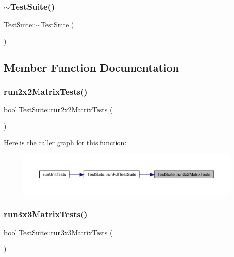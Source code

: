 \subsubsection{\texorpdfstring{$\sim$TestSuite()}{~TestSuite()}}
{\footnotesize\ttfamily Test\+Suite\+::$\sim$\+Test\+Suite (\begin{DoxyParamCaption}{ }\end{DoxyParamCaption})}



\subsection{Member Function Documentation}
\mbox{\label{class_test_suite_acf6d1ad1920132a4aed74457bb2df8cb}} 
\subsubsection{\texorpdfstring{run2x2MatrixTests()}{run2x2MatrixTests()}}
{\footnotesize\ttfamily bool Test\+Suite\+::run2x2\+Matrix\+Tests (\begin{DoxyParamCaption}{ }\end{DoxyParamCaption})}

Here is the caller graph for this function\+:
\nopagebreak
\begin{figure}[H]
\begin{center}
\leavevmode
\includegraphics[width=350pt]{class_test_suite_acf6d1ad1920132a4aed74457bb2df8cb_icgraph}
\end{center}
\end{figure}
\mbox{\label{class_test_suite_a91444c36a86d453cc9922d888b248a6b}} 
\subsubsection{\texorpdfstring{run3x3MatrixTests()}{run3x3MatrixTests()}}
{\footnotesize\ttfamily bool Test\+Suite\+::run3x3\+Matrix\+Tests (\begin{DoxyParamCaption}{ }\end{DoxyParamCaption})}

